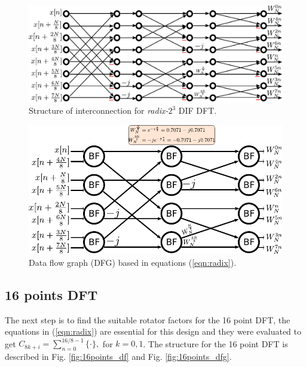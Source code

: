 \documentclass[journal,comsoc]{IEEEtran}
\begin{document}
\begin{figure}[ht] 
	\centering
	\includegraphics[width=\linewidth]{Diagramas/miSeccionFiguras/8PuntosRadix8Conexion.pdf}
	\caption{Structure of interconnection for \textit{radix-}$2^3$ DIF DFT.}
	\label{fig:8ponits_df}
\end{figure}

\begin{figure} [ht]
	\centering
	\includegraphics[width=\linewidth]{Diagramas/miSeccionFiguras/8PuntosRadix8Burbujas.pdf}
	\caption{Data flow graph (DFG) based in equations (\ref{eqn:radix}).}
	\label{fig:8ponits_dfg}
\end{figure}

\subsection{16 points DFT}
The next step is to find the suitable rotator factors for the 16 point DFT, the equations in (\ref{eqn:radix}) are essential for this design and they were evaluated to get $C_{8k+i} = \sum_{n=0}^{16/8-1} \{ \cdot \}, $ for $k=0,1$. The structure for the 16 point DFT is described in Fig. \ref{fig:16points_df} and Fig. \ref{fig:16points_dfg}. 
\end{document}
